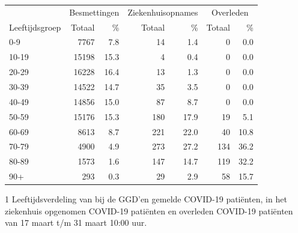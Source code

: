 \documentclass[
  english,
  man,floatsintext]{apa6}
\begin{document}
\begin{table}
\centering\begingroup\fontsize{11}{13}\selectfont

\begin{threeparttable}
\begin{tabular}{lrrrrrr}
\toprule
\multicolumn{1}{c}{ } & \multicolumn{2}{c}{Besmettingen} & \multicolumn{2}{c}{Ziekenhuisopnames} & \multicolumn{2}{c}{Overleden} \\
\cmidrule(l{3pt}r{3pt}){2-3} \cmidrule(l{3pt}r{3pt}){4-5} \cmidrule(l{3pt}r{3pt}){6-7}
Leeftijdsgroep & Totaal & \% & Totaal & \% & Totaal & \%\\
\midrule
0-9 & 7767 & 7.8 & 14 & 1.4 & 0 & 0.0\\
10-19 & 15198 & 15.3 & 4 & 0.4 & 0 & 0.0\\
20-29 & 16228 & 16.4 & 13 & 1.3 & 0 & 0.0\\
30-39 & 14522 & 14.7 & 35 & 3.5 & 0 & 0.0\\
40-49 & 14856 & 15.0 & 87 & 8.7 & 0 & 0.0\\
50-59 & 15176 & 15.3 & 180 & 17.9 & 19 & 5.1\\
60-69 & 8613 & 8.7 & 221 & 22.0 & 40 & 10.8\\
70-79 & 4900 & 4.9 & 273 & 27.2 & 134 & 36.2\\
80-89 & 1573 & 1.6 & 147 & 14.7 & 119 & 32.2\\
90+ & 293 & 0.3 & 29 & 2.9 & 58 & 15.7\\
\bottomrule
\end{tabular}
\begin{tablenotes}
\item[1] Leeftijdsverdeling van bij de GGD’en gemelde COVID-19 patiënten, in het ziekenhuis opgenomen COVID-19 patiënten en overleden COVID-19 patiënten van 17 maart t/m 31 maart 10:00 uur.
\end{tablenotes}
\end{threeparttable}
\endgroup{}
\end{table}

\newpage
\end{document}
